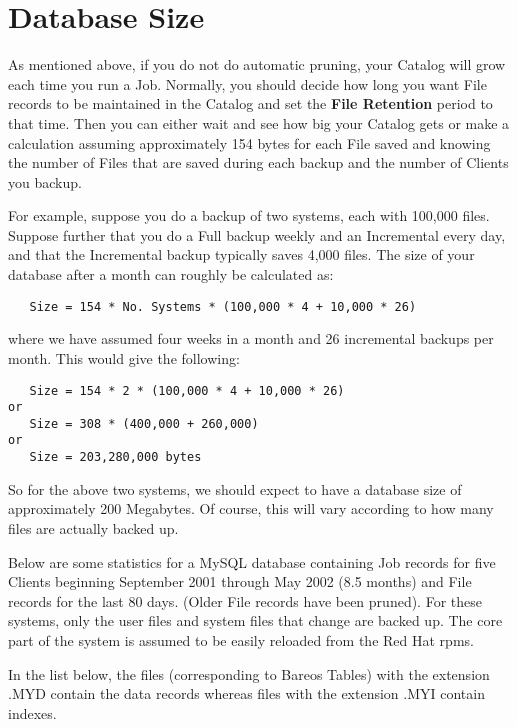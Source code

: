 \section{Database Size}

As mentioned above, if you do not do automatic pruning, your Catalog will grow
each time you run a Job. Normally, you should decide how long you want File
records to be maintained in the Catalog and set the {\bf File Retention}
period to that time. Then you can either wait and see how big your Catalog
gets or make a calculation assuming approximately 154 bytes for each File
saved and knowing the number of Files that are saved during each backup and
the number of Clients you backup.

For example, suppose you do a backup of two systems, each with 100,000 files.
Suppose further that you do a Full backup weekly and an Incremental every day,
and that the Incremental backup typically saves 4,000 files. The size of your
database after a month can roughly be calculated as:

\footnotesize
\begin{verbatim}
   Size = 154 * No. Systems * (100,000 * 4 + 10,000 * 26)
\end{verbatim}
\normalsize

where we have assumed four weeks in a month and 26 incremental backups per month.
This would give the following:

\footnotesize
\begin{verbatim}
   Size = 154 * 2 * (100,000 * 4 + 10,000 * 26)
or
   Size = 308 * (400,000 + 260,000)
or
   Size = 203,280,000 bytes
\end{verbatim}
\normalsize

So for the above two systems, we should expect to have a database size of
approximately 200 Megabytes. Of course, this will vary according to how many
files are actually backed up.

Below are some statistics for a MySQL database containing Job records for five
Clients beginning September 2001 through May 2002 (8.5 months) and File
records for the last 80 days. (Older File records have been pruned). For these
systems, only the user files and system files that change are backed up. The
core part of the system is assumed to be easily reloaded from the Red Hat rpms.


In the list below, the files (corresponding to Bareos Tables) with the
extension .MYD contain the data records whereas files with the extension .MYI
contain indexes.

